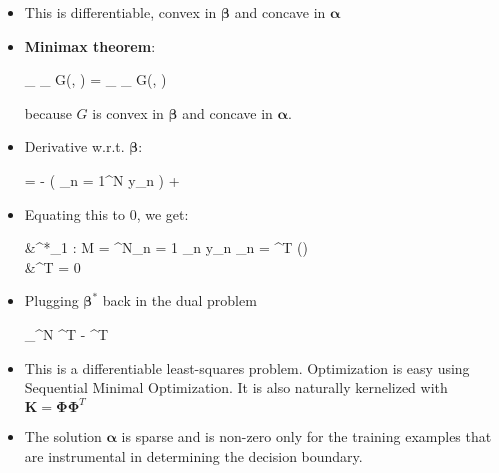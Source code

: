 \documentclass[10pt,a4paper,landscape]{article}
\makeatletter
\def\*#1{\mathbf{#1}}
\newenvironment{myalign*}{%
  \setlength{\abovedisplayskip}{2pt}%
  \setlength{\belowdisplayskip}{2pt}%
  \start@align\@ne\st@rredtrue\m@ne
}%
{\endalign}
\makeatother
\begin{document}
\begin{multicols*}{4}
\begin{itemize}
\begin{itemize}
\begin{myalign*}
		\end{myalign*}
		\item This is differentiable, convex in $\bm \beta$ and concave in $\bm \alpha$
		\item \textbf{Minimax theorem}: 
		\begin{myalign*}
		    \min_{\bm \beta} \max_{\bm \alpha} G(\bm \beta, \bm \alpha) = \max_{\bm \alpha} \min_{\bm \beta} G(\bm \beta, \bm \alpha)
		\end{myalign*}
		because $G$ is convex in $\bm \beta$ and concave in $\bm \alpha$.
		\item Derivative w.r.t. $\bm \beta$:
		\begin{myalign*}
		     = - 
		    \left(
		    	\sum_{n = 1}^N \alpha y_n \tilde{\phi_n}
		    \right)
		    + 
		\end{myalign*}
		\item Equating this to 0, we get:
			\begin{myalign*}
			    &\bm \beta^*_{1 : M} = \sum^N_{n = 1} \alpha_n y_n \phi_n = \bm \Phi^T (\*y) \bm \alpha\\
			    &\bm \alpha^T \*y = 0
			\end{myalign*}
		\item Plugging $\bm \beta^*$ back in the dual problem
		\begin{myalign*}
		    \max_{\bm \alpha \in [0, C]^N} \bm \alpha^T \*1 -  \bm \alpha^T \*Y \bm \Phi \bm \Phi \* Y \bm \alpha
		\end{myalign*}
		\item This is a differentiable least-squares problem. Optimization is easy using Sequential Minimal Optimization. It is also naturally kernelized with $\*K = \bm \Phi \bm \Phi^T$
		\item The solution $\bm \alpha$ is sparse and is non-zero only for the training examples that are instrumental in determining the decision boundary.
	\end{itemize}
\end{itemize}



\end{multicols*}
\end{document}

